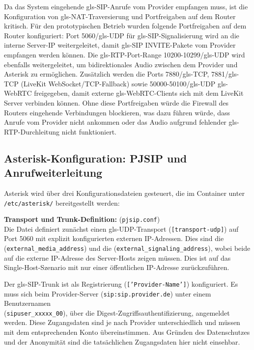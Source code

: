 Da das System eingehende \gls{gls-SIP}-Anrufe vom Provider empfangen muss, ist die Konfiguration von \gls{gls-NAT}-Traversierung und Portfreigaben auf dem Router kritisch. Für den prototypischen Betrieb wurden folgende Portfreigaben auf dem Router konfiguriert: Port 5060/\gls{gls-UDP} für \gls{gls-SIP}-Signalisierung wird an die interne Server-IP weitergeleitet, damit \gls{gls-SIP} INVITE-Pakete vom Provider empfangen werden können. Die \gls{gls-RTP}-Port-Range 10200-10299/\gls{gls-UDP} wird ebenfalls weitergeleitet, um bidirektionales Audio zwischen dem Provider und
Asterisk zu ermöglichen. Zusätzlich werden die Ports 7880/\gls{gls-TCP}, 7881/\gls{gls-TCP} (LiveKit WebSocket/TCP-Fallback) sowie 50000-50100/\gls{gls-UDP} \gls{gls-WebRTC} freigegeben, damit externe \gls{gls-WebRTC}-Clients sich mit dem LiveKit Server verbinden können. Ohne diese Portfreigaben würde die Firewall des Routers eingehende Verbindungen blockieren, was dazu führen würde, dass Anrufe vom Provider nicht ankommen oder das Audio aufgrund fehlender \gls{gls-RTP}-Durchleitung nicht funktioniert.

\subsection{Asterisk-Konfiguration: PJSIP und Anrufweiterleitung}

Asterisk wird über drei Konfigurationsdateien gesteuert, die im Container unter \texttt{/etc/asterisk/} bereitgestellt werden:

\textbf{Transport und Trunk-Definition:} (\texttt{pjsip.conf})\\
Die Datei definiert zunächst einen \gls{gls-UDP}-Transport (\texttt{[transport-udp]}) auf Port 5060 mit explizit konfigurierten externen IP-Adressen. Dies sind die\\ (\texttt{external\_media\_address}) und die (\texttt{external\_signaling\_address}), wobei beide auf die externe IP-Adresse des Server-Hosts zeigen müssen. Dies ist auf das Single-Host-Szenario mit nur einer öffentlichen IP-Adresse zurückzuführen.

Der \gls{gls-SIP}-Trunk ist als Registrierung (\texttt{['Provider-Name']}) konfiguriert. Es muss sich beim Provider-Server (\texttt{sip:sip.provider.de}) unter einem Benutzernamen\\ (\texttt{sipuser\_xxxxx\_00}), über die Digest-Zugriffsauthentifizierung, angemeldet werden. Diese Zugangsdaten sind je nach Provider unterschiedlich und müssen mit dem entsprechenden Konto übereinstimmen. Aus Gründen des Datenschutzes und der Anonymität sind die tatsächlichen Zugangsdaten hier nicht einsehbar.

